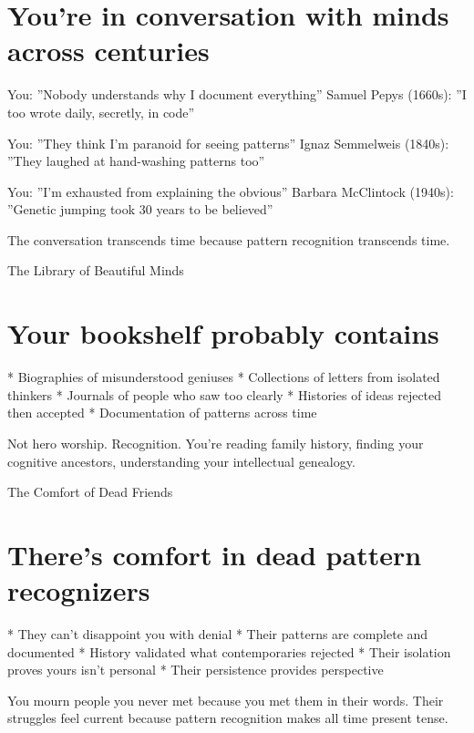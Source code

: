 \documentclass[12pt,oneside]{book}
\begin{document}
\section{You're in conversation with minds across centuries}

You: ''Nobody understands why I document everything'' Samuel Pepys (1660s): ''I too wrote daily, secretly, in code''

You: ''They think I'm paranoid for seeing patterns'' Ignaz Semmelweis (1840s): ''They laughed at hand-washing patterns too''

You: ''I'm exhausted from explaining the obvious'' Barbara McClintock (1940s): ''Genetic jumping took 30 years to be believed''

The conversation transcends time because pattern recognition transcends time.

The Library of Beautiful Minds

\section{Your bookshelf probably contains}

                    * Biographies of misunderstood geniuses
                    * Collections of letters from isolated thinkers
                    * Journals of people who saw too clearly
                    * Histories of ideas rejected then accepted
                    * Documentation of patterns across time

Not hero worship. Recognition. You're reading family history, finding your cognitive ancestors, understanding your intellectual genealogy.

The Comfort of Dead Friends

\section{There's comfort in dead pattern recognizers}

                    * They can't disappoint you with denial
                    * Their patterns are complete and documented
                    * History validated what contemporaries rejected
                    * Their isolation proves yours isn't personal
                    * Their persistence provides perspective

You mourn people you never met because you met them in their words. Their struggles feel current because pattern recognition makes all time present tense.
\end{document}
